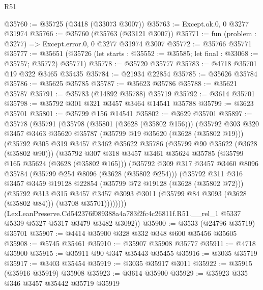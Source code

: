 \begin{lexlean}{R51}
\begin{coremodule}
@35760 := @35725 (@3418 (@33073 @3007))
@35763 := Except.ok.{0, 0} @3277 @31974
@35766 := @35760 (@35763 (@33121 @3007))
@35771 := fun (problem : @3277) => Except.error.{0, 0} @3277 @31974 @3007
@35772 := @35766 @35771
@35777 := @35651
    (@35726 (let starts : @35552 := @35585; let final : @33068 := @35757; @35772) @35771)
@35778 := @35720 @35777
@35783 := @4718 @35701 @19 @322 @3465 @35435
@35784 := @21934 @22854
@35785 := @35626 @35784
@35786 := @35625 @35785
@35787 := @35623 @35786
@35788 := @35621 @35787
@35791 := @35783 (@14892 @35788) @35719
@35792 := @3614 @35701
@35798 := @35792 @301 @321 @3457 @3464 @14541 @35788
@35799 := @3623 @35701
@35801 := @35799 @156 @14541
@35802 := @3629 @35701
@35897 := @35778
    (@35791
      (@35798
        (@35801 (@3628 (@35802 @156)))
        (@35792
          @303
          @320
          @3457
          @3463
          @35620
          @35787
          (@35799 @19 @35620 (@3628 (@35802 @19)))
          (@35792
            @305
            @319
            @3457
            @3462
            @35622
            @35786
            (@35799 @90 @35622 (@3628 (@35802 @90)))
            (@35792
              @307
              @318
              @3457
              @3461
              @35624
              @35785
              (@35799 @165 @35624 (@3628 (@35802 @165)))
              (@35792
                @309
                @317
                @3457
                @3460
                @8096
                @35784
                (@35799 @254 @8096 (@3628 (@35802 @254)))
                (@35792
                  @311
                  @316
                  @3457
                  @3459
                  @19128
                  @22854
                  (@35799 @72 @19128 (@3628 (@35802 @72)))
                  (@35792
                    @313
                    @315
                    @3457
                    @3457
                    @3093
                    @3011
                    (@35799 @84 @3093 (@3628 (@35802 @84)))
                    (@3708 @35701))))))))
      (LexLeanPreserve.Cd542376f089388a4a783f2fc4c26811f.R51.__rel_1
        @5337
        @5339
        @5327
        @5317
        @3479
        @3482
        @3092))
@35900 := @3533 (@24796 @35719) @35701
@35907 := @4414 @35900 @328 @332 @348 @600 @35456 @35605
@35908 := @5745 @35461
@35910 := @35907 @35908 @35777
@35911 := @4718 @35900
@35915 := @35911 @90 @347 @35443 @35455
@35916 := @3035 @35719
@35917 := @3403 @35454
@35919 := @3035 @35917 @3011
@35922 := @35915 (@35916 @35919) @35908
@35923 := @3614 @35900
@35929 := @35923 @335 @346 @3457 @35442 @35719 @35919

\end{coremodule}
\end{lexlean}
